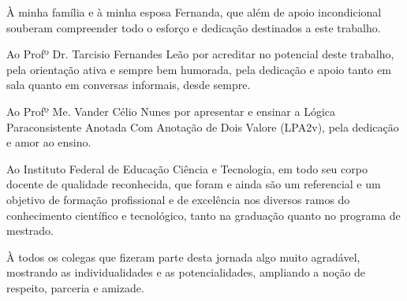 À minha família e à minha esposa Fernanda, 
que além de apoio incondicional souberam 
compreender todo o esforço e dedicação destinados a este trabalho.

Ao Profº Dr. Tarcisio Fernandes Leão 
por acreditar no potencial deste trabalho,
pela orientação ativa e sempre bem humorada, 
pela dedicação e apoio tanto em sala quanto em conversas informais, 
desde sempre. 

Ao Profº Me. Vander Célio Nunes por apresentar e ensinar a 
Lógica Paraconsistente Anotada Com Anotação de Dois Valore (LPA2v), 
pela dedicação e amor ao ensino.

Ao Instituto Federal de Educação Ciência e Tecnologia, 
em todo seu corpo docente de qualidade reconhecida, 
que foram e ainda são um referencial e um objetivo 
de formação profissional e de excelência nos diversos ramos 
do conhecimento científico e tecnológico, 
tanto na graduação quanto no programa de mestrado. 


À todos os colegas que fizeram parte desta jornada algo muito agradável, 
mostrando as individualidades e as potencialidades, 
ampliando a noção de respeito, parceria e amizade. 

 
